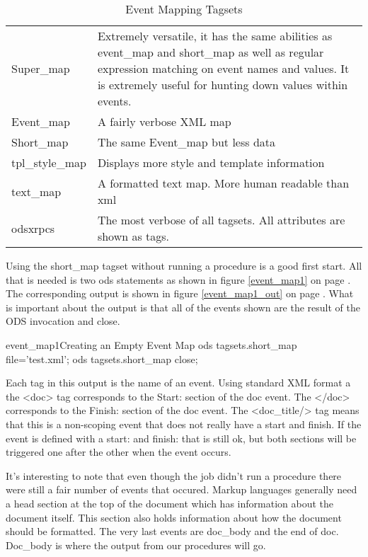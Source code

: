 \begin{table}\caption{Event Mapping Tagsets}
\label{mapping_tagsets}
\begin{tabular}{l|l} \\ \hline
Super\_map &  Extremely versatile, it has the same abilities as event\_map 
and short\_map as well as regular expression matching on event names 
and values.  It is extremely useful for hunting down values within events.\\
Event\_map &  A fairly verbose XML map \\
Short\_map &  The same Event\_map but less data \\
tpl\_style\_map & Displays more style and template information \\
text\_map & A formatted text map.  More human readable than xml \\
odsxrpcs & The most verbose of all tagsets.  
All attributes are shown as tags.\\
\end{tabular}
\end{table}

Using the short\_map tagset without running a procedure is a good first
start.
All that is needed is two ods statements as shown 
in figure \ref{event_map1}
on page \pageref{event_map1}.
The corresponding output is shown in figure \ref{event_map1_out}
on page \pageref{event_map1_out}.
What is important about the output is that all of the events shown
are the result of the ODS invocation and close.  

\begin{fvcode}{event_map1}{Creating an Empty Event Map}
ods tagsets.short_map file='test.xml';
ods tagsets.short_map close;
\end{fvcode}

Each tag in this output is the name of an event.  Using standard
XML format a the <doc> tag corresponds to the Start: section
of the doc event.  The </doc> corresponds to the Finish: section
of the doc event.  The <doc\_title/> tag means that this is
a non-scoping event that does not really have a start and finish.
If the event is defined with a start: and finish: that is still ok,
but both sections will be triggered one after the other when the
event occurs.

It's interesting to note that even though the job didn't run a procedure
there were still a fair number of events that occured.  
Markup languages
generally need a head section at the top of the document which has
information about the document itself.  This section also holds
information about how the document should be formatted.  The very
last events are doc\_body and the end of doc.  Doc\_body is where
the output from our procedures will go.  

